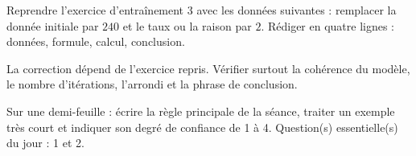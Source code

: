 
\begin{homework}Reprendre l'exercice d'entraînement 3 avec les données suivantes : remplacer la donnée initiale par $240$ et le taux ou la raison par $2$. Rédiger en quatre lignes : données, formule, calcul, conclusion.\end{homework}
\begin{solution}La correction dépend de l'exercice repris. Vérifier surtout la cohérence du modèle, le nombre d'itérations, l'arrondi et la phrase de conclusion.\end{solution}

\begin{exitticket}[3 minutes]Sur une demi-feuille : écrire la règle principale de la séance, traiter un exemple très court et indiquer son degré de confiance de 1 à 4. Question(s) essentielle(s) du jour : 1 et 2.\end{exitticket}

